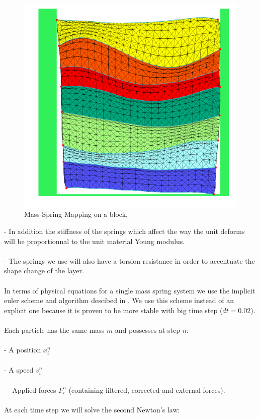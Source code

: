\documentclass[12pt, a4paper]{report} %
\begin{document}
	\begin{figure}[H]
	\centering
	\includegraphics[scale=0.5]{springMapping.png}
	\caption{Mass-Spring Mapping on a block.}
	\end{figure}
	
	\indent	- In addition the stiffness of the springs which affect the way the unit deforms will be proportionnal to the unit material Young modulus. \\\\
\indent	- The springs we use will also have a torsion resistance in order to accentuate the shape change of the layer.\\\\
In terms of physical equations for a single mass spring system we use the implicit euler scheme and algorithm descibed in \cite{caltech}. We use this scheme instead of an explicit one because it is proven to be more stable with big time step ($dt = 0.02$).\\\\ 
Each particle has the same mass $m$ and possesses at step $n$:\\\\
\indent	- A position  $x_i^n$\\\\
\indent	- A speed $v_i^n$ \\\\\
\indent	- Applied forces $F_i^n$ (containing filtered, corrected and external forces).\\\\
At each time step we will solve the second Newton's law:\\
\end{document}
